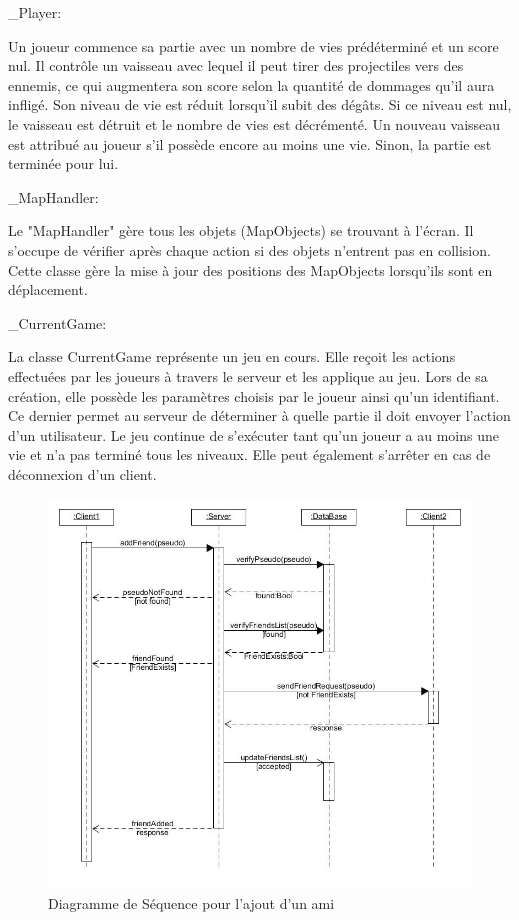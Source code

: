 \documentclass[a4paper,12pt]{article}
\begin{document}
\_Player:

Un joueur commence sa partie avec un nombre de vies prédéterminé et un score nul. 
Il contrôle un vaisseau avec lequel il peut tirer des projectiles vers des ennemis, ce qui augmentera son score selon la quantité de dommages qu'il aura infligé. Son niveau de vie est réduit lorsqu'il subit des dégâts. Si ce niveau est nul, le vaisseau est détruit et le nombre de vies est décrémenté. Un nouveau vaisseau est attribué au joueur s'il possède encore au moins une vie. Sinon, la partie est terminée pour lui.

\_MapHandler: 

Le "MapHandler" gère tous les objets (MapObjects) se trouvant à l'écran. Il s'occupe de vérifier après chaque action si des objets n'entrent pas en collision. Cette classe gère la mise à jour des positions des MapObjects lorsqu'ils sont en déplacement.

\_CurrentGame:

La classe CurrentGame représente un jeu en cours. Elle reçoit les actions effectuées par les joueurs à travers le serveur et les applique au jeu. 
Lors de sa création, elle possède les paramètres choisis par le joueur ainsi qu'un identifiant. Ce dernier permet au serveur de déterminer à quelle partie il doit envoyer l'action d'un utilisateur. Le jeu continue de s'exécuter tant qu'un joueur a au moins une vie et n'a pas terminé tous les niveaux. Elle peut également s'arrêter en cas de déconnexion d'un client.

\newpage
\begin{figure}[hbtp]
\centering
\includegraphics[scale=0.5]{images/add_friend.jpg}
\caption{Diagramme de Séquence pour l'ajout d'un ami }
\end{figure}
\end{document}
